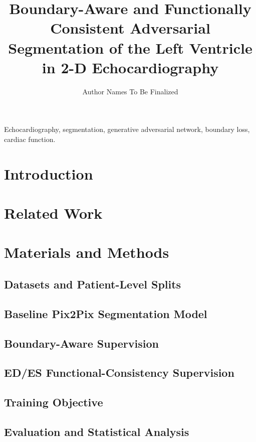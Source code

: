 \documentclass[journal]{IEEEtran}
\title{Boundary-Aware and Functionally Consistent Adversarial Segmentation of the Left Ventricle in 2-D Echocardiography}
\author{Author Names To Be Finalized}
\begin{document}
\maketitle

\begin{abstract}
\end{abstract}

\begin{IEEEkeywords}
Echocardiography, segmentation, generative adversarial network, boundary loss, cardiac function.
\end{IEEEkeywords}

\section{Introduction}

\section{Related Work}

\section{Materials and Methods}
\subsection{Datasets and Patient-Level Splits}
\subsection{Baseline Pix2Pix Segmentation Model}
\subsection{Boundary-Aware Supervision}
\subsection{ED/ES Functional-Consistency Supervision}
\subsection{Training Objective}
\subsection{Evaluation and Statistical Analysis}
\end{document}
